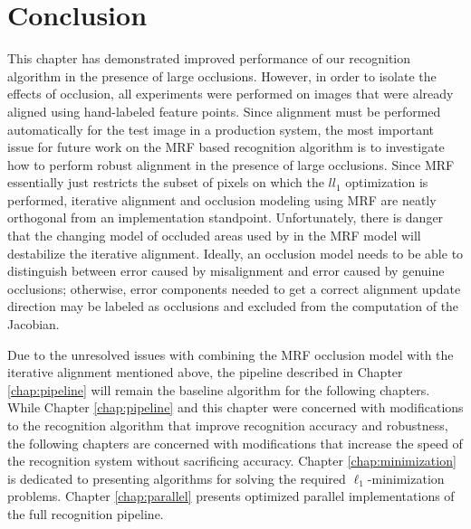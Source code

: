 \section{Conclusion} This chapter has demonstrated improved performance of our
recognition algorithm in the presence of large occlusions.  However, in order
to isolate the effects of occlusion, all experiments were performed on images
that were already aligned using hand-labeled feature points.  Since alignment
must be performed automatically for the test image in a production system, the
most important issue for future work on the MRF based recognition algorithm is
to investigate how to perform robust alignment in the presence of large
occlusions.  Since MRF essentially just restricts the subset of pixels on which
the $ll_1$ optimization is performed, iterative alignment and occlusion modeling
using MRF are neatly orthogonal from an implementation standpoint.  
Unfortunately, there is danger that the changing model of occluded areas
used by in the MRF model will destabilize the iterative alignment.  Ideally, an
occlusion model needs to be able to distinguish between error caused by
misalignment and error caused by genuine occlusions; otherwise, error
components needed to get a correct alignment update direction may be labeled as
occlusions and excluded from the computation of the Jacobian.

Due to the unresolved issues with combining the MRF occlusion model with the
iterative alignment mentioned above, the pipeline described in Chapter
\ref{chap:pipeline} will remain the baseline algorithm for the following
chapters.  While Chapter \ref{chap:pipeline} and this chapter were concerned
with modifications to the recognition algorithm that improve recognition
accuracy and robustness, the following chapters are concerned with
modifications that increase the speed of the recognition system without
sacrificing accuracy.  Chapter \ref{chap:minimization} is dedicated to
presenting algorithms for solving the required $\ell_1$-minimization problems.
Chapter \ref{chap:parallel} presents optimized parallel implementations of the
full recognition pipeline.


